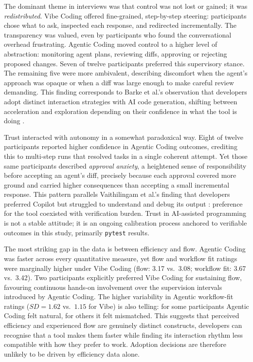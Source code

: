 The dominant theme in interviews was that control was not lost or gained; it was \emph{redistributed}. Vibe Coding offered fine-grained, step-by-step steering: participants chose what to ask, inspected each response, and redirected incrementally. The transparency was valued, even by participants who found the conversational overhead frustrating. Agentic Coding moved control to a higher level of abstraction: monitoring agent plans, reviewing diffs, approving or rejecting proposed changes. Seven of twelve participants preferred this supervisory stance. The remaining five were more ambivalent, describing discomfort when the agent's approach was opaque or when a diff was large enough to make careful review demanding. This finding corresponds to Barke et al.'s observation that developers adopt distinct interaction strategies with AI code generation, shifting between acceleration and exploration depending on their confidence in what the tool is doing \parencite{barke2023groundedcopilot}.

Trust interacted with autonomy in a somewhat paradoxical way. Eight of twelve participants reported higher confidence in Agentic Coding outcomes, crediting this to multi-step runs that resolved tasks in a single coherent attempt. Yet those same participants described \emph{approval anxiety}, a heightened sense of responsibility before accepting an agent's diff, precisely because each approval covered more ground and carried higher consequences than accepting a small incremental response. This pattern parallels Vaithilingam et al.'s finding that developers preferred Copilot but struggled to understand and debug its output \parencite{vaithilingam2022expectation}: preference for the tool coexisted with verification burden. Trust in AI-assisted programming is not a stable attitude; it is an ongoing calibration process anchored to verifiable outcomes in this study, primarily \texttt{pytest} results.

The most striking gap in the data is between efficiency and flow. Agentic Coding was faster across every quantitative measure, yet flow and workflow fit ratings were marginally higher under Vibe Coding (flow: 3.17 vs.\ 3.08; workflow fit: 3.67 vs.\ 3.42). Two participants explicitly preferred Vibe Coding for sustaining flow, favouring continuous hands-on involvement over the supervision intervals introduced by Agentic Coding. The higher variability in Agentic workflow-fit ratings ($SD=1.62$ vs.\ $1.15$ for Vibe) is also telling: for some participants Agentic Coding felt natural, for others it felt mismatched. This suggests that perceived efficiency and experienced flow are genuinely distinct constructs, developers can recognise that a tool makes them faster while finding its interaction rhythm less compatible with how they prefer to work. Adoption decisions are therefore unlikely to be driven by efficiency data alone.

